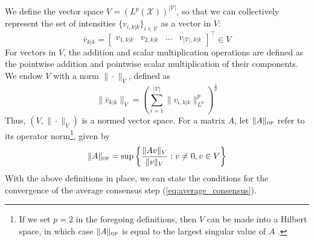 We define the vector space $V = \left(L^p(\mathcal X)\right)^{|\mathcal V|}$, so that we can collectively represent the set of intensities $\lbrace v_{i,k|k}\rbrace_{i\in\mathcal V}$ as a vector in $V$:
\[\bar v_{k|k} = \begin{bmatrix} v_{1, k|k} & v_{2, k|k} & \dots & v_{|\mathcal V|, k|k}\end{bmatrix}^\intercal \in V\]
For vectors in $V$, the addition and scalar multiplication operations are defined as the pointwise addition and pointwise scalar multiplication of their components.
We endow $V$ with a norm $\|\mathrel\cdot\|_V$, defined as
\begin{equation}
\| \bar v_{k|k}\|_V = \left(\sum_{i=1}^{|\mathcal V|} \|v_{i,k|k}\|_{L^p} ^p\right)^{\frac{1}{p}}
\end{equation}
Thus, $(V, \|\mathrel\cdot\|_V)$ is a normed vector space. For a matrix $A$, let $\|A\|_{\textsc{op}}$ refer to its operator norm\footnote{If we set $p=2$ in the foregoing definitions, then $V$ can be made into a Hilbert space, in which case $\|A\|_{\textsc{op}}$ is equal to the largest singular value of $A$ \cite[Thm. 4, p. 40]{halmos1957introduction}.}, given by
\begin{equation}
\|A\|_{\textsc{op}} = \sup \left\lbrace \frac{\|A v\|_V}{\|v\|_V} \mathrel{:} v\neq 0, v\in V \right\rbrace
\end{equation}
With the above definitions in place, we can state the conditions for the convergence of the average consensus step (\ref{eq:average_consensus}). 

